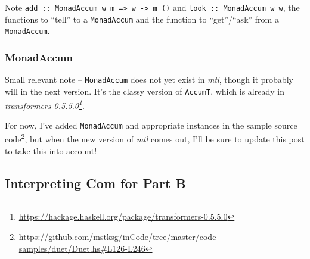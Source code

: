 \documentclass[]{article}
\newenvironment{Shaded}{}{}
\newcommand{\CommentTok}[1]{\textcolor[rgb]{0.38,0.63,0.69}{\textit{#1}}}
\newcommand{\DataTypeTok}[1]{\textcolor[rgb]{0.56,0.13,0.00}{#1}}
\newcommand{\DecValTok}[1]{\textcolor[rgb]{0.25,0.63,0.44}{#1}}
\newcommand{\FunctionTok}[1]{\textcolor[rgb]{0.02,0.16,0.49}{#1}}
\newcommand{\KeywordTok}[1]{\textcolor[rgb]{0.00,0.44,0.13}{\textbf{#1}}}
\newcommand{\NormalTok}[1]{#1}
\newcommand{\OtherTok}[1]{\textcolor[rgb]{0.00,0.44,0.13}{#1}}
\renewcommand{\href}[2]{#2\footnote{\url{#1}}}
\begin{document}
\begin{Shaded}
\end{Shaded}

Note
\texttt{add\ ::\ MonadAccum\ w\ m\ =\textgreater{}\ w\ -\textgreater{}\ m\ ()}
and \texttt{look\ ::\ MonadAccum\ w\ w}, the functions to ``tell'' to a
\texttt{MonadAccum} and the function to ``get''/``ask'' from a
\texttt{MonadAccum}.

\hypertarget{monadaccum}{%
\subsubsection{MonadAccum}\label{monadaccum}}

Small relevant note -- \texttt{MonadAccum} does not yet exist in \emph{mtl},
though it probably will in the next version. It's the classy version of
\texttt{AccumT}, which is already in
\emph{\href{https://hackage.haskell.org/package/transformers-0.5.5.0}{transformers-0.5.5.0}}.

For now, I've added \texttt{MonadAccum} and appropriate instances in the
\href{https://github.com/mstksg/inCode/tree/master/code-samples/duet/Duet.hs\#L126-L246}{sample
source code}, but when the new version of \emph{mtl} comes out, I'll be sure to
update this post to take this into account!

\hypertarget{interpreting-com-for-part-b}{%
\subsection{Interpreting Com for Part B}\label{interpreting-com-for-part-b}}
\end{document}
